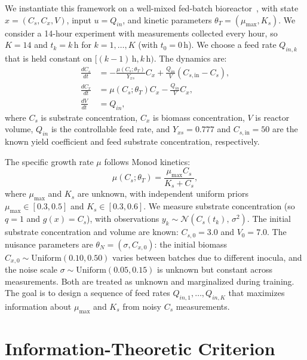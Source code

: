 \documentclass[conference]{IEEEtran}
\begin{document}
We instantiate this framework on a well-mixed fed-batch bioreactor~\cite{versyck}, with state $x = (C_s, C_x, V)$, input $u = Q_{in}$, and kinetic parameters $\theta_T = (\mu_{\max}, K_s)$.
We consider a 14-hour experiment with measurements collected every hour, so $K=14$ and $t_k = k\,\mathrm{h}$ for $k=1,\ldots,K$ (with $t_0=0\,\mathrm{h}$).
We choose a feed rate $Q_{in,k}$ that is held constant on $[(k-1)\,\mathrm{h}, k\,\mathrm{h})$.
The dynamics are:
\begin{equation}\label{eq:bioreactor}
\begin{aligned}
\frac{dC_s}{dt} &= -\frac{\mu(C_s; \theta_T)}{Y_{xs}} C_x + \frac{Q_{in}}{V}(C_{s,\text{in}} - C_s),\\
\frac{dC_x}{dt} &= \mu(C_s; \theta_T) C_x - \frac{Q_{in}}{V}C_x,\\
\frac{dV}{dt} &= Q_{in},
\end{aligned}
\end{equation}
where $C_s$ is substrate concentration, $C_x$ is biomass concentration, $V$ is reactor volume, $Q_{in}$ is the controllable feed rate, and $Y_{xs} = 0.777$ and $C_{s,\text{in}} = 50$ are the known yield coefficient and feed substrate concentration, respectively.

The specific growth rate $\mu$ follows Monod kinetics:
\begin{equation}
\mu(C_s; \theta_T) = \frac{\mu_{\max} C_s}{K_s + C_s},
\end{equation}
where $\mu_{\max}$ and $K_s$ are unknown, with independent uniform priors $\mu_{\max} \in [0.3, 0.5]$ and $K_s \in [0.3, 0.6]$.
We measure substrate concentration (so $q=1$ and $g(x)=C_s$), with observations $y_k \sim \mathcal{N}(C_s(t_k),\, \sigma^2)$.
The initial substrate concentration and volume are known: $C_{s,0} = 3.0$ and $V_0 = 7.0$.
The nuisance parameters are $\theta_N = (\sigma, C_{x,0})$: the initial biomass $C_{x,0} \sim \text{Uniform}(0.10, 0.50)$ varies between batches due to different inocula, and the noise scale $\sigma \sim \text{Uniform}(0.05, 0.15)$ is unknown but constant across measurements. Both are treated as unknown and marginalized during training.
The goal is to design a sequence of feed rates $Q_{in,1}, \ldots, Q_{in,K}$ that maximizes information about $\mu_{\max}$ and $K_s$ from noisy $C_s$ measurements.

\section{Information-Theoretic Criterion}
\label{sec:criterion}
\end{document}
